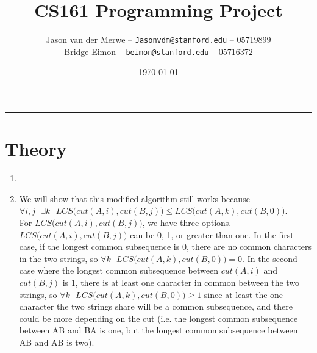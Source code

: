 \documentclass[12pt]{article}
\title{CS161 Programming Project}
\author{Jason van der Merwe -- \texttt{Jasonvdm@stanford.edu} -- 05719899\\
Bridge Eimon -- \texttt{beimon@stanford.edu} -- 05716372}
\date{\today}
\begin{document}
\maketitle

\vspace{-0.3in}
\rule{\linewidth}{0.4pt}


\section*{Theory}
\begin{enumerate}[label=(\alph*)]
    \item 
    \item We will show that this modified algorithm still works because $\forall i,j \text{ } \exists k \text{ } LCS\big(cut(A,i), cut(B,j)\big) \le LCS\big(cut(A,k), cut(B,0)\big)$.\\
    For $LCS\big(cut(A,i), cut(B,j)\big)$, we have three options. $LCS\big(cut(A,i), cut(B,j)\big)$ can be 0, 1, or greater than one. In the first case, if the longest common subsequence is 0, there are no common characters in the two strings, so $\forall k \text{ } LCS\big(cut(A,k), cut(B,0)\big) = 0$. In the second case where the longest common subsequence between $cut(A,i)$ and $cut(B,j)$ is 1, there is at least one character in common between the two strings, so $\forall k \text{ } LCS\big(cut(A,k), cut(B,0)\big) \ge 1$ since at least the one character the two strings share will be a common subsequence, and there could be more depending on the cut (i.e. the longest common subsequence between AB and BA is one, but the longest common subsequence between AB and AB is two).\\

\end{enumerate}
\end{document}
